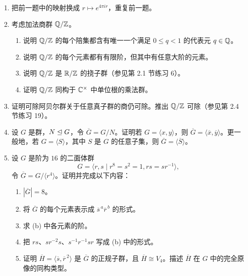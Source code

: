 \begin{enumerate}[label=\arabic*.]
\begin{center}
\end{center}
  \item 把前一题中的映射换成 $r\mapsto e^{4\pi ir}$，重复前一题。
  \item 考虑加法商群 $\mathbb{Q}/\mathbb{Z}$。
  \begin{enumerate}[label=(\alph*)]
    \item 说明 $\mathbb{Q}/\mathbb{Z}$ 的每个陪集都含有唯一一个满足 $0\leq q<1$ 的代表元 $q\in\mathbb{Q}$。
    \item 说明 $\mathbb{Q}/\mathbb{Z}$ 的每个元素都有有限阶，但其中有任意大阶的元素。
    \item 说明 $\mathbb{Q}/\mathbb{Z}$ 是 $\mathbb{R}/\mathbb{Z}$ 的挠子群（参见第 2.1 节练习 6）。
    \item 证明 $\mathbb{Q}/\mathbb{Z}$ 同构于 $\mathbb{C}^\times$ 中单位根的乘法群。
  \end{enumerate}
  \item 证明可除阿贝尔群关于任意真子群的商仍可除。推出 $\mathbb{Q}/\mathbb{Z}$ 可除（参见第 2.4 节练习 19）。
  \item 设 $G$ 是群，$N\trianglelefteq G$，令 $\overline G=G/N$。证明若 $G=\langle x,y\rangle$，则 $\overline G=\langle\overline x,\overline y\rangle$。更一般地，若 $G=\langle S\rangle$，其中 $S$ 是 $G$ 的任意子集，则 $\overline G=\langle\overline S\rangle$。
  \item 设 $G$ 是阶为 $16$ 的二面体群
  \[
    G=\langle r,s\mid r^8=s^2=1,rs=sr^{-1}\rangle,
  \]
  令 $\overline G=G/\langle r^4\rangle$。证明并完成以下内容：
  \begin{enumerate}[label=(\alph*)]
    \item $|\overline G|=8$。
    \item 将 $\overline G$ 的每个元素表示成 $\overline s^{\,a}\overline r^{\,b}$ 的形式。
    \item 求 (b) 中各元素的阶。
    \item 把 $rs$、$sr^{-2}s$、$s^{-1}r^{-1}sr$ 写成 (b) 中的形式。
    \item 证明 $\overline H=\langle\overline s,\overline r^{\,2}\rangle$ 是 $\overline G$ 的正规子群，且 $\overline H\cong V_4$。描述 $\overline H$ 在 $G$ 中的完全原像的同构类型。

\end{enumerate}
\end{enumerate}
